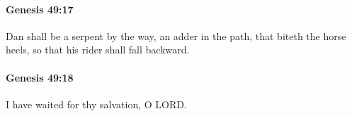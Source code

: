 		\paragraph{Genesis 49:17} %
			\label{GENESIS-49-17}

			Dan shall be a serpent by the way, an adder in the path, that biteth the horse heels, so that his rider shall fall backward.


		\paragraph{Genesis 49:18} %
			\label{GENESIS-49-18}

			I have waited for thy salvation, O LORD.


